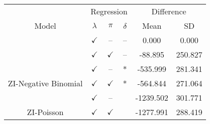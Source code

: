 \documentclass[
]{article}
\begin{document}
\begin{tabular}{cccccc}
\toprule
\multicolumn{1}{c}{ } & \multicolumn{3}{c}{Regression} & \multicolumn{2}{c}{Difference} \\
\cmidrule(l{3pt}r{3pt}){2-4} \cmidrule(l{3pt}r{3pt}){5-6}
Model & $\lambda$ & $\pi$ & $\delta$ & Mean & SD\\
\midrule
 & $\checkmark$ & -- & -- & 0.000 & 0.000\\

 & $\checkmark$ & $\checkmark$ & -- & -88.895 & 250.827\\

 & $\checkmark$ & -- & * & -535.999 & 281.341\\

\multirow{-4}{*}{\centering\arraybackslash ZI-Negative Binomial} & $\checkmark$ & $\checkmark$ & * & -564.844 & 271.064\\
\cmidrule{1-6}
 & $\checkmark$ & -- &  & -1239.502 & 301.771\\

\multirow{-2}{*}{\centering\arraybackslash ZI-Poisson} & $\checkmark$ & $\checkmark$ &  & -1277.991 & 288.419\\
\bottomrule
\end{tabular}
\end{document}
